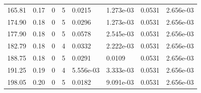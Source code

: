 \documentclass[preview]{standalone}
\begin{document}
{{\begin{tabular}{L{1.2cm}C{1.2cm} C{0.3cm}C{0.5cm} C{1.4cm}C{1.4cm} C{1.4cm}C{1.4cm}}
  165.81  &  0.17  & 0     &  5 &  0.0215  & 1.273e-03  & 0.0531 &  2.656e-03   \\ 
  174.90  &  0.18  & 0     &  5 &  0.0296  & 1.273e-03  & 0.0531 &  2.656e-03   \\ 
  177.90  &  0.18  & 0     &  5 &  0.0578  & 2.545e-03  & 0.0531 &  2.656e-03   \\ 
  182.79  &  0.18  & 0     &  4 &  0.0332  & 2.222e-03  & 0.0531 &  2.656e-03   \\ 
  188.75  &  0.18  & 0     &  5 &  0.0291  & 0.0109  & 0.0531 &  2.656e-03   \\ 
  191.25  &  0.19  & 0     &  4 &  5.556e-03  & 3.333e-03  & 0.0531 &  2.656e-03   \\ 
  198.05  &  0.20  & 0     &  5 &  0.0182  & 9.091e-03  & 0.0531 &  2.656e-03   \\ 
\hline 
\end{tabular} 

}}
\end{document}
